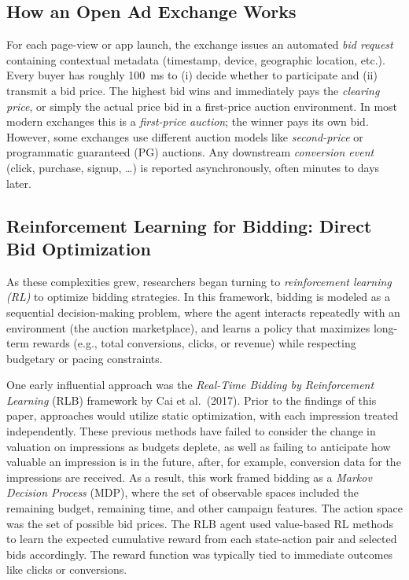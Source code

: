 \documentclass[11pt]{article}
\begin{document}
\subsection{How an Open Ad Exchange Works}
\label{sec:exchange}

For each page-view or app launch, the exchange issues an automated \emph{bid
request} containing contextual metadata (timestamp, device, geographic location,
etc.).  Every buyer has roughly \SI{100}{\milli\second} to (i) decide
whether to participate and (ii) transmit a bid price.
The highest bid wins and immediately pays the \emph{clearing price}, or simply the actual price bid in a first-price auction environment.
In most modern exchanges this is a \emph{first-price auction}; the
winner pays its own bid. However, some exchanges use different auction
models like \emph{second-price} or programmatic guaranteed (PG) auctions.
Any downstream \emph{conversion event} (click, purchase, signup, \dots) is reported asynchronously, often minutes to days later.


\subsection{Reinforcement Learning for Bidding: Direct Bid Optimization}

As these complexities grew, researchers began turning to \emph{reinforcement learning (RL)} to optimize bidding strategies. In this framework, bidding is modeled as a sequential decision-making problem, where the agent interacts repeatedly with an environment (the auction marketplace), and learns a policy that maximizes long-term rewards (e.g., total conversions, clicks, or revenue) while respecting budgetary or pacing constraints.

One early influential approach was the \textit{Real-Time Bidding by Reinforcement Learning} (RLB) framework by Cai et al.\ (2017). Prior to the findings of this paper, approaches would utilize static optimization, with each impression treated independently. These previous methods have failed to consider the change in valuation on impressions as budgets deplete, as well as failing to anticipate how valuable an impression is in the future, after, for example, conversion data for the impressions are received. As a result, this work framed bidding as a \textit{Markov Decision Process} (MDP), where the set of observable spaces included the remaining budget, remaining time, and other campaign features. The action space was the set of possible bid prices. The RLB agent used value-based RL methods to learn the expected cumulative reward from each state-action pair and selected bids accordingly. The reward function was typically tied to immediate outcomes like clicks or conversions.
\end{document}
